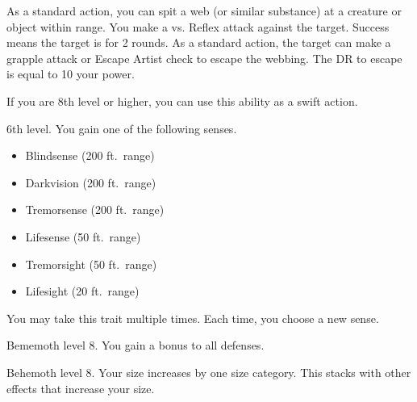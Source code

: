     \featben As a standard action, you can spit a web (or similar substance) at a creature or object within \rngmed range.
    You make a  vs. Reflex attack against the target.
    Success means the target is \immobilized for 2 rounds.
    As a standard action, the target can make a grapple attack or Escape Artist check to escape the webbing.
    The DR to escape is equal to 10 \add your power.

    If you are 8th level or higher, you can use this ability as a swift action.

    \featpre 6th level.
    \featben You gain one of the following senses.
    \begin{itemize}
        \item Blindsense (200 ft.\ range)
        \item Darkvision (200 ft.\ range)
        \item Tremorsense (200 ft.\ range)
        \item Lifesense (50 ft.\ range)
        \item Tremorsight (50 ft.\ range)
        \item Lifesight (20 ft.\ range)
    \end{itemize}
     You may take this trait multiple times.
    Each time, you choose a new sense.

    \featpre Bememoth level 8.
    \featben You gain a  bonus to all defenses.

    \featpre Behemoth level 8.
    \featben Your size increases by one size category.
    This stacks with other effects that increase your size.
